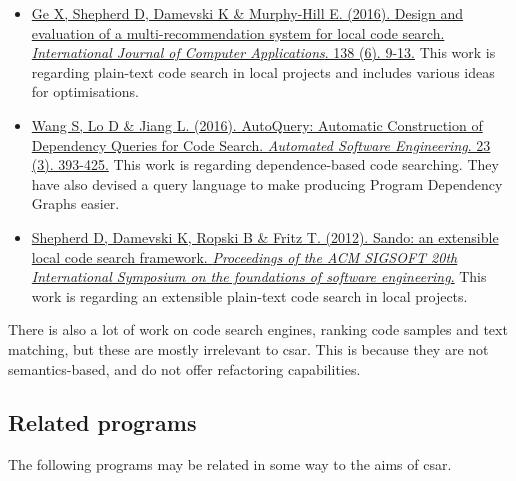 \documentclass[12pt, letterpaper]{article}
\begin{document}
\begin{itemize}
  \item \href{http://www.sciencedirect.com.ezproxy.library.qmul.ac.uk/science/article/pii/S1045926X16300970?_rdoc=1&_fmt=high&_origin=gateway&_docanchor=&md5=b8429449ccfc9c30159a5f9aeaa92ffb&ccp=y}{Ge X, Shepherd D, Damevski K \& Murphy-Hill E. (2016). Design and evaluation of a multi-recommendation system for local code search. \textit{International Journal of Computer Applications}. 138 (6). 9-13.}\newline
  This work is regarding plain-text code search in local projects and includes various ideas for optimisations.
  \item \href{https://link-springer-com.ezproxy.library.qmul.ac.uk/article/10.1007%2Fs10515-014-0170-2}{Wang S, Lo D \& Jiang L. (2016). AutoQuery: Automatic Construction of Dependency Queries for Code Search. \textit{Automated Software Engineering}. 23 (3). 393-425.}\newline
  This work is regarding dependence-based code searching.
  They have also devised a query language to make producing Program Dependency Graphs easier.
  \item \href{http://dl.acm.org.ezproxy.library.qmul.ac.uk/citation.cfm?id=2393612}{Shepherd D, Damevski K, Ropski B \& Fritz T. (2012). Sando: an extensible local code search framework. \textit{Proceedings of the ACM SIGSOFT 20th International Symposium on the foundations of software engineering}.}\newline
  This work is regarding an extensible plain-text code search in local projects.
\end{itemize}

There is also a lot of work on code search engines, ranking code samples and text matching, but these are mostly irrelevant to csar.
This is because they are not semantics-based, and do not offer refactoring capabilities.

\subsection{Related programs}
The following programs may be related in some way to the aims of csar.
\end{document}
